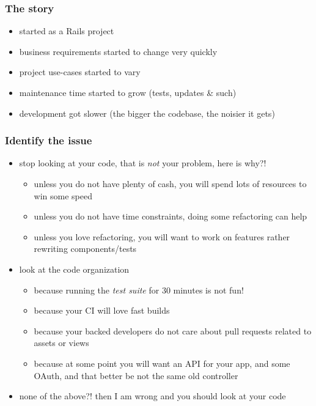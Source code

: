 \documentclass[compress]{beamer}
\begin{document}
\begin{frame}
\frametitle{The story}

\begin{itemize}[<+->]
  \item started as a Rails project
  \item business requirements started to change very quickly
  \item project use-cases started to vary
  \item maintenance time started to grow (tests, updates \& such)
  \item development got slower (the bigger the codebase, the noisier it gets)
\end{itemize}
\end{frame}

\begin{frame}
\frametitle{Identify the issue}

\begin{itemize}[<+->]
  \item stop looking at your code, that is \emph{not} your problem, here is why?!
    \begin{itemize}
      \item unless you do not have plenty of cash, you will spend lots of resources to win some speed
      \item unless you do not have time constraints, doing some refactoring can help
      \item unless you love refactoring, you will want to work on features rather rewriting components/tests
    \end{itemize}
  \item look at the code organization
    \begin{itemize}
      \item because running the \emph{test suite} for 30 minutes is not fun!
      \item because your CI will love fast builds
      \item because your backed developers do not care about pull requests related to assets or views
      \item because at some point you will want an API for your app, and some OAuth, and that better be not the same old controller
    \end{itemize}
  \item none of the above?! then I am wrong and you should look at your code
\end{itemize}
\end{frame}
\end{document}
